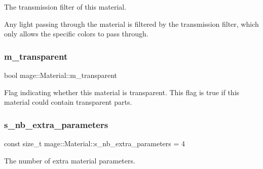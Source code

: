 The transmission filter of this material.

Any light passing through the material is filtered by the transmission filter, which only allows the specific colors to pass through. \hypertarget{structmage_1_1_material_abaaf4666e33f4a7952ef9d0801e3f199}{}\label{structmage_1_1_material_abaaf4666e33f4a7952ef9d0801e3f199} 
\subsubsection{\texorpdfstring{m\+\_\+transparent}{m\_transparent}}
{\footnotesize\ttfamily bool mage\+::\+Material\+::m\+\_\+transparent\hspace{0.3cm}{\ttfamily [private]}}

Flag indicating whether this material is transparent. This flag is {\ttfamily true} if this material could contain transparent parts. \hypertarget{structmage_1_1_material_ab8d10c2cb8ab77bee18654e63acaa63a}{}\label{structmage_1_1_material_ab8d10c2cb8ab77bee18654e63acaa63a} 
\subsubsection{\texorpdfstring{s\+\_\+nb\+\_\+extra\+\_\+parameters}{s\_nb\_extra\_parameters}}
{\footnotesize\ttfamily const size\+\_\+t mage\+::\+Material\+::s\+\_\+nb\+\_\+extra\+\_\+parameters = 4\hspace{0.3cm}{\ttfamily [static]}}

The number of extra material parameters. 
